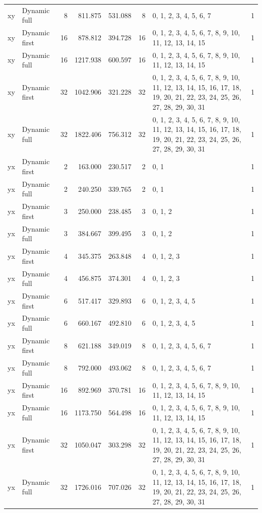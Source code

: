 \documentclass[10pt,a4paper]{article}
\begin{document}
\begin{longtable}{@{}p{23mm}p{29mm}rrrrp{36mm}r@{}}
xy & Dynamic full & 8 & 811.875 & 531.088 & 8 & 0, 1, 2, 3, 4, 5, 6, 7 & 1 \\
xy & Dynamic first & 16 & 878.812 & 394.728 & 16 & 0, 1, 2, 3, 4, 5, 6, 7, 8, 9, 10, 11, 12, 13, 14, 15 & 1 \\
xy & Dynamic full & 16 & 1217.938 & 600.597 & 16 & 0, 1, 2, 3, 4, 5, 6, 7, 8, 9, 10, 11, 12, 13, 14, 15 & 1 \\
xy & Dynamic first & 32 & 1042.906 & 321.228 & 32 & 0, 1, 2, 3, 4, 5, 6, 7, 8, 9, 10, 11, 12, 13, 14, 15, 16, 17, 18, 19, 20, 21, 22, 23, 24, 25, 26, 27, 28, 29, 30, 31 & 1 \\
xy & Dynamic full & 32 & 1822.406 & 756.312 & 32 & 0, 1, 2, 3, 4, 5, 6, 7, 8, 9, 10, 11, 12, 13, 14, 15, 16, 17, 18, 19, 20, 21, 22, 23, 24, 25, 26, 27, 28, 29, 30, 31 & 1 \\
yx & Dynamic first & 2 & 163.000 & 230.517 & 2 & 0, 1 & 1 \\
yx & Dynamic full & 2 & 240.250 & 339.765 & 2 & 0, 1 & 1 \\
yx & Dynamic first & 3 & 250.000 & 238.485 & 3 & 0, 1, 2 & 1 \\
yx & Dynamic full & 3 & 384.667 & 399.495 & 3 & 0, 1, 2 & 1 \\
yx & Dynamic first & 4 & 345.375 & 263.848 & 4 & 0, 1, 2, 3 & 1 \\
yx & Dynamic full & 4 & 456.875 & 374.301 & 4 & 0, 1, 2, 3 & 1 \\
yx & Dynamic first & 6 & 517.417 & 329.893 & 6 & 0, 1, 2, 3, 4, 5 & 1 \\
yx & Dynamic full & 6 & 660.167 & 492.810 & 6 & 0, 1, 2, 3, 4, 5 & 1 \\
yx & Dynamic first & 8 & 621.188 & 349.019 & 8 & 0, 1, 2, 3, 4, 5, 6, 7 & 1 \\
yx & Dynamic full & 8 & 792.000 & 493.062 & 8 & 0, 1, 2, 3, 4, 5, 6, 7 & 1 \\
yx & Dynamic first & 16 & 892.969 & 370.781 & 16 & 0, 1, 2, 3, 4, 5, 6, 7, 8, 9, 10, 11, 12, 13, 14, 15 & 1 \\
yx & Dynamic full & 16 & 1173.750 & 564.498 & 16 & 0, 1, 2, 3, 4, 5, 6, 7, 8, 9, 10, 11, 12, 13, 14, 15 & 1 \\
yx & Dynamic first & 32 & 1050.047 & 303.298 & 32 & 0, 1, 2, 3, 4, 5, 6, 7, 8, 9, 10, 11, 12, 13, 14, 15, 16, 17, 18, 19, 20, 21, 22, 23, 24, 25, 26, 27, 28, 29, 30, 31 & 1 \\
yx & Dynamic full & 32 & 1726.016 & 707.026 & 32 & 0, 1, 2, 3, 4, 5, 6, 7, 8, 9, 10, 11, 12, 13, 14, 15, 16, 17, 18, 19, 20, 21, 22, 23, 24, 25, 26, 27, 28, 29, 30, 31 & 1 \\
\end{longtable}\normalsize\setlength{\tabcolsep}{6pt}
\clearpage
\end{document}
